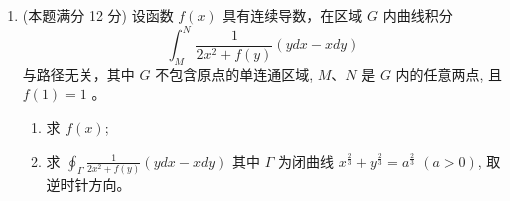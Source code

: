 \begin{enumerate}
{	\textbf{解方程.} 齐次部分特征根 $\pm i$，给出 $c_1\cos r+c_2\sin r$；
	设特解 $u^{*}=Ar^{2}+Br+C$，代入得 $2A+Ar^{2}+Br+C=r^{2}$，
	比较系数 $A=1,\ B=0,\ C=-2$。故
	\[
	u(r)=c_{1}\cos r+c_{2}\sin r+r^{2}-2 ,
	\]
	即
	\[
	u=c_{1}\cos\sqrt{x^{2}+y^{2}}+c_{2}\sin\sqrt{x^{2}+y^{2}}+x^{2}+y^{2}-2 .
	\]

	\par\vspace{1mm}\noindent
	\textbf{注：}{\kaishu
	本题的关键是 $-\frac1x\frac{\partial u}{\partial x}$ 恰好把极坐标拉普拉斯算子里的
	$\frac1r\frac{du}{dr}$ 消去，方程才成为常系数的 $u''+u=r^{2}$。
	又因方程中出现 $\frac1x$，所求解只在 $x\neq0$ 的区域内有意义；
	若还要求 $u$ 作为 $(x,y)$ 的函数在原点附近光滑，则须取 $c_2=0$，
	因为 $\sin\sqrt{x^2+y^2}$ 在原点不可微。
	}\par
}

\item 
(本题满分 12 分)
设函数 $f(x)$ 具有连续导数，在区域 $G$ 内曲线积分
\[ 
\int_{M}^{N} \frac{1}{2 x^{2}+f(y)}(y d x-x d y)
 \]
与路径无关，其中 $G$ 不包含原点的单连通区域, $M 、 N$ 是 $G$ 内的任意两点, 且 $f(1)=1$ 。
\begin{enumerate}
	\item
 求 $f(x)$;
\item 
求 $\oint_{\Gamma} \frac{1}{2 x^{2}+f(y)}(y d x-x d y)$ 其中 $\Gamma$ 为闭曲线 $x^{\frac{2}{3}}+y^{\frac{2}{3}}=a^{\frac{2}{3}}$ $ (a>0) $, 取逆时针方向。
\end{enumerate}

\end{enumerate}
